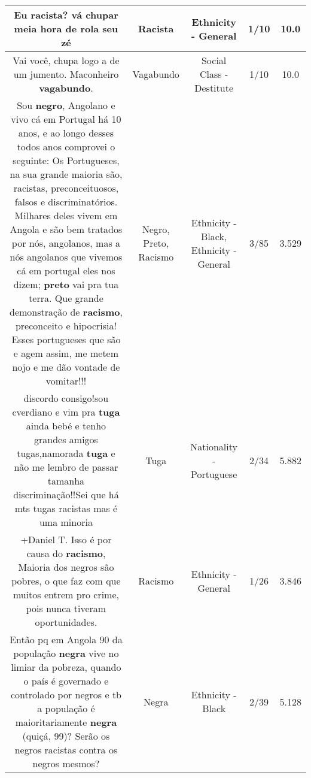 \documentclass[11pt]{article}
\newlength\mylength
\begin{document}
\begin{center}
\begin{longtable}{|C{.65\mylength}|C{.30\mylength}|C{.12\mylength}|C{.12\mylength}|C{.12\mylength}|}
  \small Eu \textbf{racista}? vá chupar meia hora de rola seu zé\normalsize   & Racista & Ethnicity - General & 1/10 & 10.0 \\  \hline
  \small Vai você, chupa logo a de um jumento. Maconheiro \textbf{vagabundo}.\normalsize   & Vagabundo & Social Class - Destitute & 1/10 & 10.0 \\  \hline
  \small Sou \textbf{negro}, Angolano e vivo cá em Portugal há 10 anos, e ao longo desses todos anos comprovei  o seguinte: Os Portugueses, na sua grande maioria são, racistas, preconceituosos, falsos e discriminatórios. Milhares deles vivem em Angola e são bem tratados por nós, angolanos, mas a nós angolanos que vivemos cá em portugal eles nos dizem; \textbf{preto} vai pra tua terra. Que grande demonstração de \textbf{racismo}, preconceito e hipocrisia! Esses portugueses que são e agem assim, me metem nojo e me dão vontade de vomitar!!!\normalsize   & Negro, Preto, Racismo & Ethnicity - Black, Ethnicity - General & 3/85 & 3.529 \\  \hline
  \small discordo consigo!sou cverdiano e vim pra \textbf{tuga} ainda bebé e tenho grandes amigos tugas,namorada \textbf{tuga} e não me lembro de passar tamanha discriminação!!Sei que há mts tugas racistas mas é uma minoria\normalsize   & Tuga & Nationality - Portuguese & 2/34 & 5.882 \\  \hline
  \small +Daniel T. Isso é por causa do \textbf{racismo}, Maioria dos negros são pobres, o que faz com que muitos entrem pro crime, pois nunca tiveram oportunidades.\normalsize   & Racismo & Ethnicity - General & 1/26 & 3.846 \\  \hline
  \small Então pq em Angola 90 da população \textbf{negra} vive no limiar da pobreza, quando o país é governado e controlado por negros e tb a população é maioritariamente \textbf{negra} (quiçá, 99)? Serão os negros racistas contra os negros mesmos?\normalsize   & Negra & Ethnicity - Black & 2/39 & 5.128 \\  \hline

\end{longtable}
\end{center}
\end{document}
